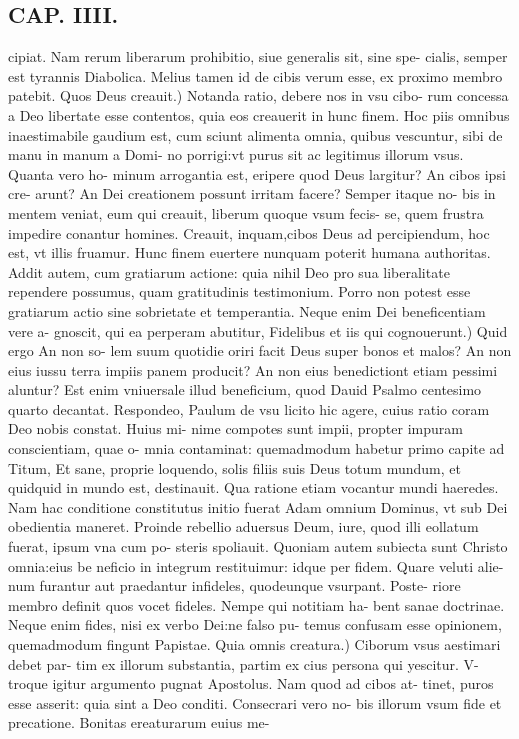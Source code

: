\documentclass{article}
\begin{document}
\begin{pages}
\section*{CAP. IIII. }
\marginpar{[ p.47 ]}\pstart cipiat. Nam rerum liberarum prohibitio, siue generalis sit, sine spe- cialis, semper est tyrannis Diabolica. Melius tamen id de cibis verum esse, ex proximo membro patebit.  \pend\pstart Quos Deus creauit.) Notanda ratio, debere nos in vsu cibo- rum concessa a Deo libertate esse contentos, quia eos creauerit in hunc finem. Hoc piis omnibus inaestimabile gaudium est, cum sciunt alimenta omnia, quibus vescuntur, sibi de manu in manum a Domi- no porrigi:vt purus sit ac legitimus illorum vsus. Quanta vero ho- minum arrogantia est, eripere quod Deus largitur? An cibos ipsi cre- arunt? An Dei creationem possunt irritam facere? Semper itaque no- bis in mentem veniat, eum qui creauit, liberum quoque vsum fecis- se, quem frustra impedire conantur homines. Creauit, inquam,cibos Deus ad percipiendum, hoc est, vt illis fruamur. Hunc finem euertere nunquam poterit humana authoritas. Addit autem, cum gratiarum actione: quia nihil Deo pro sua liberalitate rependere possumus, quam gratitudinis testimonium. Porro non potest esse gratiarum actio sine sobrietate et temperantia. Neque enim Dei beneficentiam vere a- gnoscit, qui ea perperam abutitur,  \pend\pstart Fidelibus et iis qui cognouerunt.) Quid ergo An non so- lem suum quotidie oriri facit Deus super bonos et malos? An non eius iussu terra impiis panem producit? An non eius benedictiont etiam pessimi aluntur? Est enim vniuersale illud beneficium, quod Dauid Psalmo centesimo quarto decantat. Respondeo, Paulum de vsu licito hic agere, cuius ratio coram Deo nobis constat. Huius mi- nime compotes sunt impii, propter impuram conscientiam, quae o- mnia contaminat: quemadmodum habetur primo capite ad Titum, Et sane, proprie loquendo, solis filiis suis Deus totum mundum, et quidquid in mundo est, destinauit. Qua ratione etiam vocantur mundi haeredes. Nam hac conditione constitutus initio fuerat Adam omnium Dominus, vt sub Dei obedientia maneret. Proinde rebellio aduersus Deum, iure, quod illi eollatum fuerat, ipsum vna cum po- steris spoliauit. Quoniam autem subiecta sunt Christo omnia:eius be neficio in integrum restituimur: idque per fidem. Quare veluti alie- num furantur aut praedantur infideles, quodeunque vsurpant. Poste- riore membro definit quos vocet fideles. Nempe qui notitiam ha- bent sanae doctrinae. Neque enim fides, nisi ex verbo Dei:ne falso pu- temus confusam esse opinionem, quemadmodum fingunt Papistae. Quia omnis creatura.) Ciborum vsus aestimari debet par- tim ex illorum substantia, partim ex cius persona qui yescitur. V- troque igitur argumento pugnat Apostolus. Nam quod ad cibos at- tinet, puros esse asserit: quia sint a Deo conditi. Consecrari vero no- bis illorum vsum fide et precatione. Bonitas ereaturarum euius me-  \pend

\end{pages}
\end{document}
